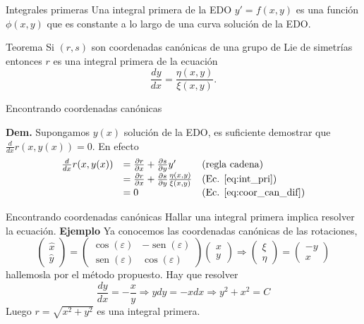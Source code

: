 \documentclass{article}
\renewcommand{\epsilon}{\varepsilon}
\DeclareMathOperator{\sen}{sen}
\begin{document}
 {Integrales primeras}
Una integral primera de la EDO $y'=f(x,y)$ es una función $\phi(x,y)$ que es constante a lo largo de una curva solución de la EDO. 


 {Teorema} Si $(r,s)$ son coordenadas canónicas de una grupo de Lie de simetrías entonces $r$ es una integral primera de la ecuación
\begin{equation}\label{eq:int_pri} \frac{dy}{dx}=\frac{\eta(x,y)}{\xi(x,y)}.
\end{equation}






{Encontrando coordenadas canónicas}

\textbf{Dem.} Supongamos $y(x)$ solución de la EDO, es suficiente demostrar que $\frac{d}{dx}r(x,y(x))=0$. En efecto
\[
\begin{array}{lll}
 \frac{d}{dx}r(x,y(x)) &=\frac{\partial r}{\partial x}+\frac{\partial s}{\partial y}y' &\text{(regla cadena)}\\
&=\frac{\partial r}{\partial x}+\frac{\partial s}{\partial y}\frac{\eta(x,y)}{\xi(x,y)}& \text{(Ec. \eqref{eq:int_pri})}\\
&=0 & \text{(Ec. \eqref{eq:coor_can_dif})}\\
\end{array}
\]





{Encontrando coordenadas canónicas}
Hallar una integral primera implica resolver la ecuación.
\textbf{Ejemplo} Ya conocemos las coordenadas canónicas de las rotaciones, 
\[
 \begin{pmatrix} \hat{x}\\ \hat{y}
\end{pmatrix}=\begin{pmatrix} \cos(\epsilon) & -\sen(\epsilon)
\\ \sen(\epsilon) & \cos(\epsilon)
\end{pmatrix} \begin{pmatrix} x\\ y
\end{pmatrix}\Rightarrow  \begin{pmatrix} \xi\\ \eta
\end{pmatrix}= \begin{pmatrix} -y\\ x
\end{pmatrix}
\]
hallemosla por el método propuesto. Hay que resolver 
\[\frac{dy}{dx}=-\frac{x}{y}\Rightarrow ydy=-xdx\Rightarrow y^2+x^2=C\]
Luego $r=\sqrt{x^2+y^2}$ es una integral primera. 
\end{document}
